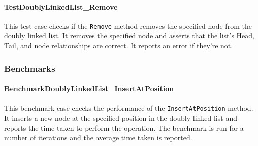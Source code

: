 \paragraph{TestDoublyLinkedList\_Remove}
This test case checks if the \lstinline{Remove} method removes the specified node from the doubly linked list. It removes the specified node and asserts that the list's Head, Tail, and node relationships are correct. It reports an error if they're not.

\subsubsection*{Benchmarks}


\paragraph{BenchmarkDoublyLinkedList\_InsertAtPosition}
This benchmark case checks the performance of the \lstinline{InsertAtPosition} method. It inserts a new node at the specified position in the doubly linked list and reports the time taken to perform the operation. The benchmark is run for a number of iterations and the average time taken is reported.

